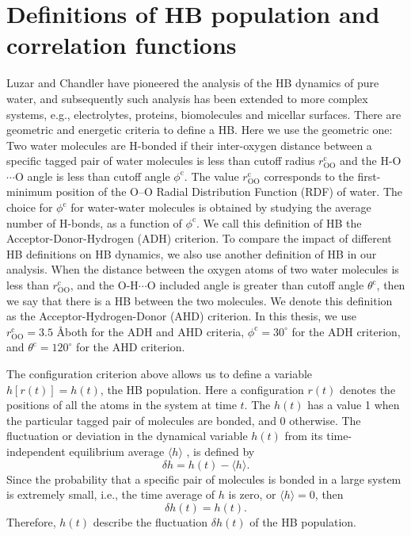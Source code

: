 \section{Definitions of HB population and correlation functions}\label{section:def_HBP}
Luzar and Chandler\cite{AL96} have pioneered the analysis of the HB dynamics of pure water, and
subsequently such analysis has been extended to more complex systems, e.g., electrolytes\cite{Chandra2000}, proteins\cite{Tarek02,Matthias13}, 
biomolecules\cite{Kolano06} and micellar surfaces\cite{SP05}.
There are geometric\cite{Kumar2007} and energetic\cite{Sciortino1989} criteria to define a HB.
Here we use the geometric one:
Two water molecules are H-bonded if their inter-oxygen distance between a specific tagged pair of water molecules 
is less than cutoff radius $r^{\text{c}}_{\text{OO}}$ and
the H-O$\cdots$O angle is less than cutoff angle $\phi^{\text{c}}$\cite{AKS86,JT90,SB02}. 
The value $r^{\text{c}}_{\text{OO}}$ corresponds to the first-minimum position of the O--O Radial Distribution Function (RDF) of water\cite{Sciortino1989}.   
The choice for $\phi^{\text{c}}$ for water-water molecules is obtained by studying the average number of H-bonds,
as a function of $\phi^{\text{c}}$\cite{Luzar1993}. We call this definition of HB the Acceptor-Donor-Hydrogen (ADH) criterion. 
To compare the impact of different HB definitions on HB dynamics, we also use another definition of HB in our analysis. 
When the distance between the oxygen atoms of two water molecules is less than $r^{\text{c}}_{\text{OO}}$, 
and the O-H$\cdots$O included angle is greater than cutoff angle $\theta^{\text{c}}$, then we say that there is a HB between the two molecules. 
We denote this definition as the Acceptor-Hydrogen-Donor (AHD) criterion.
In this thesis, we use $r^{\text{c}}_{\text{OO}}=3.5$ \AA both for the ADH and AHD criteria, $\phi^{\text{c}}=30^{\circ}$ for the ADH criterion, 
and $\theta^{\text{c}}=120^{\circ}$ for the AHD criterion.

The configuration criterion above allows us to define a variable $h[r(t)] = h(t)$, the HB population. 
Here a configuration $r(t)$ denotes the positions of all the atoms in the system at time $t$\cite{AL96}.  
The $h(t)$ has a value 1 when the particular tagged pair of molecules are bonded, and 0 otherwise. 
The fluctuation or deviation in the dynamical variable $h(t)$ from its time-independent equilibrium average $\langle h\rangle$ , 
is defined by\cite{DC87} 
$$
\delta h = h(t) - \langle h\rangle.
$$
Since the probability that a specific pair of molecules is bonded in a large system is extremely small, i.e., 
the time average of $h$ is zero, or  
$\langle h \rangle = 0$,
then
$$
\delta h(t) = h(t).
$$
Therefore, $h(t)$ describe the fluctuation $\delta h(t)$  of the HB population.  

